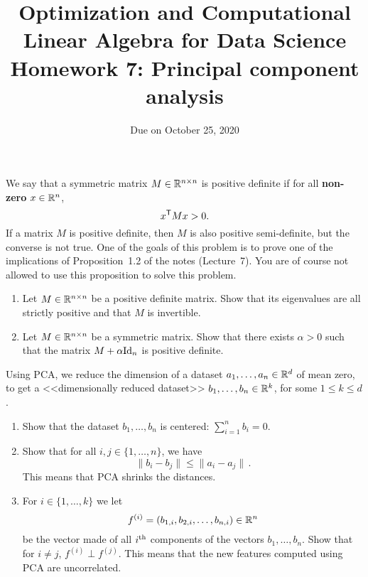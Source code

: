 \documentclass[11pt,nocut]{article}
\title{\vspace{-2.0cm}%
	Optimization and Computational Linear Algebra for Data Science\\
Homework 7: Principal component analysis}
\date{\vspace{-1cm}Due on October 25, 2020}
\begin{document}
\maketitle


\vspace{5mm}

\begin{problem}[2 points]
	We say that a symmetric matrix $M \in \mathbb{R}^{n \times n}$ is positive definite if for all \textbf{non-zero} $x \in \mathbb{R}^n$,
	$$
	x^{{\sf T}} M x > 0.
	$$
	If a matrix $M$ is positive definite, then $M$ is also positive semi-definite, but the converse is not true. One of the goals of this problem is to prove one of the implications of Proposition~1.2 of the notes (Lecture~7). You are of course not allowed to use this proposition to solve this problem.
	\begin{enumerate}[label=\normalfont(\textbf{\alph*})]
		\item Let $M \in \mathbb{R}^{n \times n}$ be a positive definite matrix. Show that its eigenvalues are all strictly positive and that $M$ is invertible. 
		\item Let $M \in \mathbb{R}^{n \times n}$ be a symmetric matrix. Show that there exists $\alpha > 0$ such that the matrix $M + \alpha {{\rm Id}}_n$ is positive definite.
	\end{enumerate}
\end{problem}

\vspace{5mm}

\begin{problem}[3 points]
	Using PCA, we reduce the dimension of a dataset $a_1, \dots, a_n \in \mathbb{R}^d$ of mean zero, to get a <<dimensionally reduced dataset>> $b_1 , \dots, b_n \in \mathbb{R}^k$, for some $1 \leq k \leq d$.
	\begin{enumerate}[label=\normalfont(\textbf{\alph*})]
		\item Show that the dataset $b_1, \dots, b_n$ is centered: $\sum_{i = 1}^n b_i = 0$.
		\item Show that for all $i,j \in \{1, \dots, n\}$, we have
			$$
				\|b_i - b_j\| \leq \|a_i - a_j\| \,.
			$$
			This means that PCA shrinks the distances.
		\item For $i \in \{1, \dots, k\}$ we let
			$$
			f^{(i)} = (b_{1,i}, b_{2,i}, \dots, b_{n,i}) \in \mathbb{R}^n
			$$
			be the vector made of all $i^{\rm th}$ components of the vectors $b_1, \dots, b_n$.
			Show that for $i \neq j$, $f^{(i)} \perp f^{(j)}$. This means that the new features computed using PCA are uncorrelated.
	\end{enumerate}
\end{problem}
\end{document}
